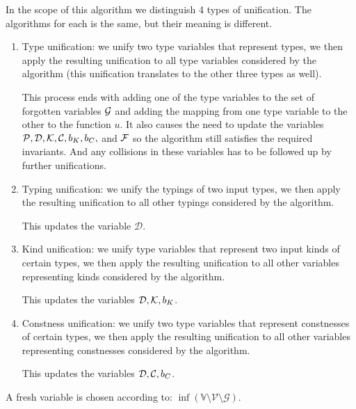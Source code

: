 \begin{defn}[Unifications]
    In the scope of this algorithm we distinguish 4 types of unification. The algorithms for each is the same, but their meaning is different.

    \begin{enumerate}
        \item Type unification: we unify two type variables that represent types, we then apply the resulting unification to all type variables considered by the algorithm (this unification translates to the other three types as well). \label{tUni}

        This process ends with adding one of the type variables to the set of forgotten variables $\mathcal G$ and adding the mapping from one type variable to the other to the function $u$. It also causes the need to update the variables $\mathcal P, \mathcal D, \mathcal K, \mathcal C, b_K, b_C,$ and $\mathcal F$ so the algorithm still satisfies the required invariants. And any collisions in these variables has to be followed up by further unifications.

        \item Typing unification: we unify the typings of two input types, we then apply the resulting unification to all other typings considered by the algorithm.  \label{tyUni}
        
        This updates the variable $\mathcal D$.

        \item Kind unification: we unify type variables that represent two input kinds of certain types, we then apply the resulting unification to all other variables representing kinds considered by the algorithm. \label{kUni}
        
        This updates the variables $\mathcal D, \mathcal K, b_K$.

        \item Constness unification: we unify two type variables that represent constnesses of certain types, we then apply the resulting unification to all other variables representing constnesses considered by the algorithm. \label{cUni} 
        
        This updates the variables $\mathcal D, \mathcal C, b_C$.
    \end{enumerate}
\end{defn}

\begin{defn}
    \label{freshVar}
    A fresh variable is chosen according to: \linebreak $\inf \left(\mathbb{V} \setminus \mathcal{V} \setminus \mathcal{G}\right)$.
\end{defn}

